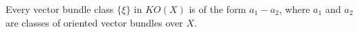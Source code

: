 Every vector bundle class $\{\xi\}$ in $KO(X)$ is of the form $a_1 - a_2$, where $a_1$ and $a_2$ are classes of oriented vector bundles over $X$.
